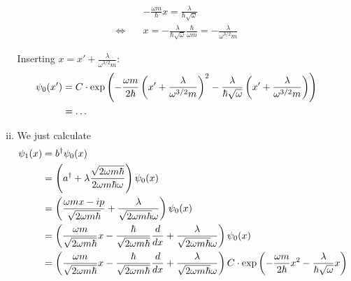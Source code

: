 \documentclass[a4paper,german,12pt,smallheadings]{scrartcl}
\begin{document}
\begin{enumerate}[a)]
\begin{enumerate}[i)]
      \begin{align*}
        &-\frac{\omega m}{\hbar} x = \frac{\lambda}{\hbar\sqrt{\omega}} \\
        \Leftrightarrow\quad& x = -\frac{\lambda}{\hbar \sqrt{\omega}} \frac{\hbar}{\omega m} = -\frac{\lambda}{\omega^{3/2} m}
      \end{align*}

      Inserting $x = x' + \frac{\lambda}{\omega^{3/2} m}$:
      \begin{align*}
        \psi_0(x') &= C \cdot \exp \del{-\frac{\omega m}{2 \hbar} \del{x' + \frac{\lambda}{\omega^{3/2} m}}^2 - \frac{\lambda}{\hbar \sqrt{\omega}} \del{x' + \frac{\lambda}{\omega^{3/2} m}}} \\
                   &= \dots
      \end{align*}
    \item
      We just calculate
      \begin{align*}
        \psi_1(x)  &= b^\dagger \psi_0(x) \\
                   &= \del{a^\dagger + \lambda \frac{\sqrt{2 \omega m \hbar}}{2 \omega m \hbar \omega}} \psi_0(x) \\
                   &= \del{\frac{\omega m x - i p}{\sqrt{2 \omega m \hbar}} + \frac{\lambda}{\sqrt{2 \omega m \hbar} \omega}} \psi_0(x) \\
                   &= \del{\frac{\omega m}{\sqrt{2 \omega m \hbar}} x - \frac{\hbar}{\sqrt{2 \omega m \hbar}} \frac{d}{dx} + \frac{\lambda}{\sqrt{2 \omega m \hbar} \omega}} \psi_0(x) \\
                   &= \del{\frac{\omega m}{\sqrt{2 \omega m \hbar}} x - \frac{\hbar}{\sqrt{2 \omega m \hbar}} \frac{d}{dx} + \frac{\lambda}{\sqrt{2 \omega m \hbar} \omega}} C \cdot \exp \del{-\frac{\omega m}{2 \hbar} x^2 - \frac{\lambda}{\hbar \sqrt{\omega}} x}
      \end{align*}
  \end{enumerate}

\end{enumerate}
\end{document}
